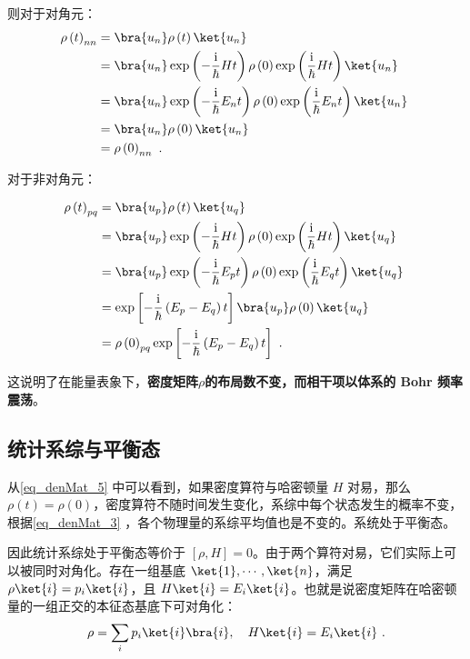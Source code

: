 则对于对角元：
\begin{equation}
\begin{aligned}
\rho\left( t \right)_{nn} &= \bra{u_n}\rho\left( t \right)\ket{u_n}\\
&= \bra{u_n}\exp\left(-\frac{\mathrm{i}}{\hbar}H t\right)\rho\left( 0 \right)\exp\left(\frac{\mathrm{i}}{\hbar}H t\right)\ket{u_n} \\
&=\bra{u_n}\exp\left(-\frac{\mathrm{i}}{\hbar}E_n t\right)  \rho\left( 0 \right)  \exp\left(\frac{\mathrm{i}}{\hbar}E_n t\right)  \ket{u_n} \\
&=\bra{u_n}\rho\left( 0 \right)\ket{u_n} \\
&=\rho\left( 0 \right)_{nn}~.
\end{aligned}~
\end{equation}

对于非对角元：

\begin{equation}
\begin{aligned}
\rho \left( t \right)_{pq} &= \bra{u_p}\rho\left(t\right)\ket{u_q} \\
&= \bra{u_p}\exp\left(-\frac{\mathrm{i}}{\hbar}H t\right)\rho\left(0\right)\exp\left(\frac{\mathrm{i}}{\hbar}H t\right)\ket{u_q} \\
&= \bra{u_p}\exp\left(-\frac{\mathrm{i}}{\hbar}E_p t\right)\rho\left( 0 \right)\exp\left(\frac{\mathrm{i}}{\hbar}E_q t\right)\ket{u_q} \\
&=\exp\left[-\frac{\mathrm{i}}{\hbar}\left(E_p-E_q\right) t\right]\bra{u_p}\rho\left( 0 \right)\ket{u_q} \\
&= \rho \left( 0 \right)_{pq}\exp\left[-\frac{\mathrm{i}}{\hbar}\left(E_p-E_q\right) t\right]~.
\end{aligned}~
\end{equation}

这说明了在能量表象下，\textbf{密度矩阵$\rho$的布局数不变，而相干项以体系的 Bohr 频率震荡}。






\subsection{统计系综与平衡态}
从\autoref{eq_denMat_5} 中可以看到，如果密度算符与哈密顿量 $H$ 对易，那么 $\rho(t)=\rho(0)$，密度算符不随时间发生变化，系综中每个状态发生的概率不变，根据\autoref{eq_denMat_3} ，各个物理量的系综平均值也是不变的。系统处于平衡态。

因此统计系综处于平衡态等价于 $[\rho,H]=0$。由于两个算符对易，它们实际上可以被同时对角化。存在一组基底 $\ket{1},\cdots,\ket{n}$，满足 $\rho \ket{i} = p_i \ket{i}$，且 $H\ket{i}=E_i \ket{i}$。也就是说密度矩阵在哈密顿量的一组正交的本征态基底下可对角化：
\begin{equation}
\rho = \sum_i p_i \ket{i}\bra{i},\quad H\ket{i}=E_i \ket{i}~.
\end{equation}

